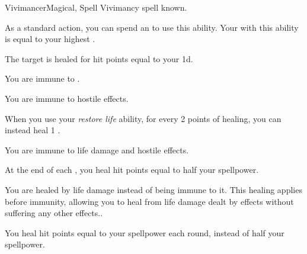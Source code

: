     \begin{feat}{Vivimancer}{Magical, Spell}
        \featpre Vivimancy spell known.
        \featben

         As a standard action, you can spend an  to use this ability.
        Your  with this ability is equal to your highest .
        \begin{ability}
            \begin{spelltargetinginfo}
            \end{spelltargetinginfo}
            \begin{spelleffects}
                \spelleffect The target is healed for hit points equal to your  \plus1d.
            \end{spelleffects}
        \end{ability}

         You are immune to .

         You are immune to hostile  effects.

         When you use your \textit{restore life} ability, for every 2 points of healing, you can instead heal 1 .

         You are immune to life damage and hostile  effects.

         At the end of each , you heal hit points equal to half your spellpower.

         You are healed by life damage instead of being immune to it.
        This healing applies before immunity, allowing you to heal from life damage dealt by  effects without suffering any other effects..

         You heal hit points equal to your spellpower each round, instead of half your spellpower.
    \end{feat}

